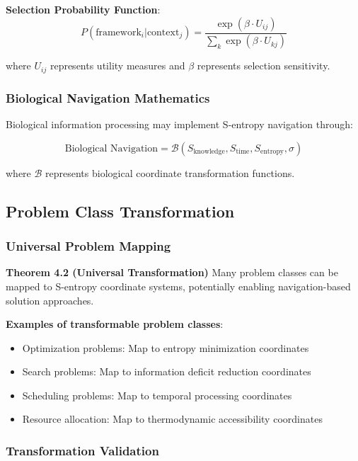 \documentclass[11pt]{article}
\begin{document}
\textbf{Selection Probability Function}:
\begin{equation}
P(\text{framework}_i | \text{context}_j) = \frac{\exp(\beta \cdot U_{ij})}{\sum_k \exp(\beta \cdot U_{kj})}
\label{eq:framework_selection}
\end{equation}

where $U_{ij}$ represents utility measures and $\beta$ represents selection sensitivity.

\subsubsection{Biological Navigation Mathematics}

Biological information processing may implement S-entropy navigation through:

\begin{equation}
\text{Biological Navigation} = \mathcal{B}(S_{\text{knowledge}}, S_{\text{time}}, S_{\text{entropy}}, \sigma)
\label{eq:biological_navigation}
\end{equation}

where $\mathcal{B}$ represents biological coordinate transformation functions.

\subsection{Problem Class Transformation}

\subsubsection{Universal Problem Mapping}

\textbf{Theorem 4.2 (Universal Transformation)} Many problem classes can be mapped to S-entropy coordinate systems, potentially enabling navigation-based solution approaches.

\textbf{Examples of transformable problem classes}:
\begin{itemize}
\item Optimization problems: Map to entropy minimization coordinates
\item Search problems: Map to information deficit reduction coordinates
\item Scheduling problems: Map to temporal processing coordinates
\item Resource allocation: Map to thermodynamic accessibility coordinates
\end{itemize}

\subsubsection{Transformation Validation}
\end{document}
